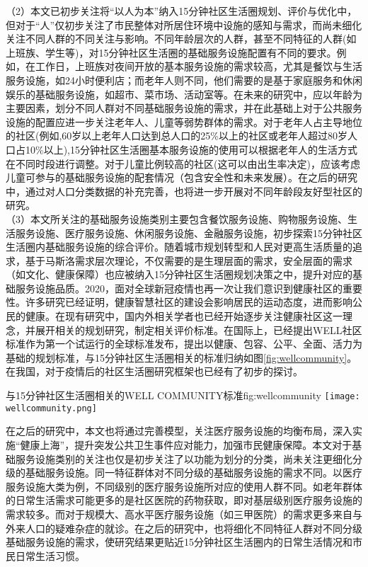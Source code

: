 \documentclass{shnuthesis}
\begin{document}
（2）本文已初步关注将“以人为本”纳入15分钟社区生活圈规划、评价与优化中，但对于“人”仅初步关注了市民整体对所居住环境中设施的感知与需求，而尚未细化关注不同人群的不同关注与影响。不同年龄层次的人群，甚至不同特征的人群(如上班族、学生等)，对15分钟社区生活圈的基础服务设施配置有不同的要求。例如，在工作日，上班族对夜间开放的基本服务设施的需求较高，尤其是餐饮与生活服务设施，如24小时便利店；而老年人则不同，他们需要的是基于家庭服务和休闲娱乐的基础服务设施，如超市、菜市场、活动室等。在未来的研究中，应以年龄为主要因素，划分不同人群对不同基础服务设施的需求，并在此基础上对于公共服务设施的配置应进一步关注老年人、儿童等弱势群体的需求。对于老年人占主导地位的社区(例如,60岁以上老年人口达到总人口的25\%以上的社区或老年人超过80岁人口占10\%以上),15分钟社区生活圈基本服务设施的使用可以根据老年人的生活方式在不同时段进行调整\textsuperscript{\cite{huang2019a}}。对于儿童比例较高的社区(这可以由出生率决定)，应该考虑儿童可参与的基础服务设施的配套情况（包含安全性和未来发展）\textsuperscript{\cite{peng2020}}。在之后的研究中，通过对人口分类数据的补充完善，也将进一步开展对不同年龄段友好型社区的研究。\\
\indent （3）本文所关注的基础服务设施类别主要包含餐饮服务设施、购物服务设施、生活服务设施、医疗服务设施、休闲服务设施、金融服务设施，初步探索15分钟社区生活圈内基础服务设施的综合评价。随着城市规划转型和人民对更高生活质量的追求，基于马斯洛需求层次理论，不仅需要的是生理层面的需求，安全层面的需求（如文化、健康保障）也应被纳入15分钟社区生活圈规划决策之中，提升对应的基础服务设施品质。2020，面对全球新冠疫情也再一次让我们意识到健康社区的重要性。许多研究已经证明，健康智慧社区的建设会影响居民的运动态度，进而影响公民的健康\textsuperscript{\cite{lovasi2011}}。在现有研究中，国内外相关学者也已经开始逐步关注健康社区这一理念，并展开相关的规划研究，制定相关评价标准。在国际上，已经提出WELL社区标准作为第一个试运行的全球标准发布，提出以健康、包容、公平、全面、活力为基础的规划标准\textsuperscript{\cite{li2019a}}，与15分钟社区生活圈相关的标准归纳如图\ref{fig:wellcommunity}。在我国，对于疫情后的社区生活圈研究框架也已经有了初步的探讨\textsuperscript{\cite{shen2020,chai2020}}。

\begin{generalfig}[htb]{与15分钟社区生活圈相关的WELL COMMUNITY标准}{fig:wellcommunity}
	\texttt{[image: wellcommunity.png]}
\end{generalfig}

在之后的研究中，本文也将通过完善模型，关注医疗服务设施的均衡布局，深入实施“健康上海”，提升突发公共卫生事件应对能力，加强市民健康保障。本文对于基础服务设施类别的关注也仅是初步关注了以功能为划分的分类，尚未关注更细化分级的基础服务设施。同一特征群体对不同分级的基础服务设施的需求不同。以医疗服务设施大类为例，不同级别的医疗服务设施所对应的使用人群不同。如老年群体的日常生活需求可能更多的是社区医院的药物获取，即对基层级别医疗服务设施的需求较多。而对于规模大、高水平医疗服务设施（如三甲医院）的需求更多来自与外来人口的疑难杂症的就诊。在之后的研究中，也将细化不同特征人群对不同分级基础服务设施的需求，使研究结果更贴近15分钟社区生活圈内的日常生活情况和市民日常生活习惯。
\end{document}
